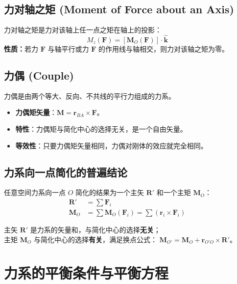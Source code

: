 \documentclass[12pt,a4paper]{article}
\newcommand{\vect}[1]{\mathbf{#1}}                   %
\newcommand{\unitv}[1]{\hat{\mathbf{#1}}}            %
\begin{document}
\subsection{力对轴之矩 (Moment of Force about an Axis)}
力对轴之矩是力对该轴上任一点之矩在轴上的投影：
\begin{equation}
    M_z(\vect{F}) = [\vect{M}_O(\vect{F})] \cdot \unitv{k}
\end{equation}
\textbf{性质：}若力 $\vect{F}$ 与轴平行或力 $\vect{F}$ 的作用线与轴相交，则力对该轴之矩为零。

\subsection{力偶 (Couple)}
力偶是由两个等大、反向、不共线的平行力组成的力系。
\begin{itemize}
    \item \textbf{力偶矩矢量}：$\vect{M} = \vect{r}_{BA} \times \vect{F}$。
    \item \textbf{特性}：力偶矩与简化中心的选择无关，是一个自由矢量。
    \item \textbf{等效性}：只要力偶矩矢量相同，力偶对刚体的效应就完全相同。
\end{itemize}

\subsection{力系向一点简化的普遍结论}
任意空间力系向一点 $O$ 简化的结果为一个主矢 $\vect{R}'$ 和一个主矩 $\vect{M}_O$：
\begin{align}
    \vect{R}' &= \sum \vect{F}_i \\
    \vect{M}_O &= \sum \vect{M}_O(\vect{F}_i) = \sum (\vect{r}_i \times \vect{F}_i)
\end{align}

\begin{tcolorbox}[colback=red!5!white, colframe=red!75!black, title=主矢与主矩的区别]
主矢 $\vect{R}'$ 是力系的矢量和，与简化中心的选择\textbf{无关}；\\
主矩 $\vect{M}_O$ 与简化中心的选择\textbf{有关}，满足换点公式：
$\vect{M}_{O'} = \vect{M}_O + \vect{r}_{O'O} \times \vect{R}'$。
\end{tcolorbox}

\section{力系的平衡条件与平衡方程}
\end{document}
